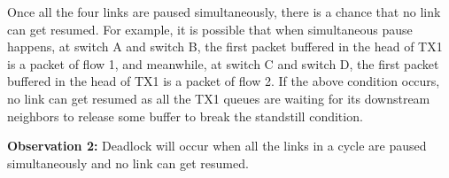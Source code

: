 Once all the four links are paused simultaneously, there is a chance that no link can get resumed. 
For example, it is possible that when simultaneous pause happens, at switch A and switch B, the 
first packet buffered in the head of TX1 is a packet of flow 1, and meanwhile, at switch C and switch 
D, the first packet buffered in the head of TX1 is a packet of flow 2. If the above condition occurs, 
no link can get resumed as all the TX1 queues are waiting for its downstream neighbors to release some 
buffer to break the standstill condition.

\textbf{Observation 2:} Deadlock will occur when all the links in a cycle are paused simultaneously 
and no link can get resumed.


\begin{figure}[t]
\centering



\end{figure}
